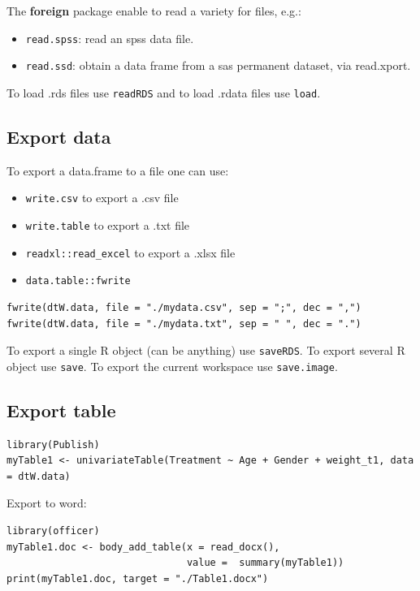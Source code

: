 \documentclass{article}
\begin{document}
\bigskip

The \textbf{foreign} package enable to read a variety for files, e.g.:
\begin{itemize}
\item \texttt{read.spss}: read an spss data file.
\item \texttt{read.ssd}: obtain a data frame from a sas permanent dataset, via read.xport.
\end{itemize}

\bigskip

To load .rds files use \texttt{readRDS} and to load .rdata files use \texttt{load}.

\subsection{Export data}
\label{sec:org182862b}

To export a data.frame to a file one can use:
\begin{itemize}
\item \texttt{write.csv} to export a .csv file
\item \texttt{write.table} to export a .txt file
\item \texttt{readxl::read\_excel} to export a .xlsx file
\item \texttt{data.table::fwrite}
\end{itemize}
\lstset{language=r,label= ,caption= ,captionpos=b,numbers=none}
\begin{lstlisting}
fwrite(dtW.data, file = "./mydata.csv", sep = ";", dec = ",")
fwrite(dtW.data, file = "./mydata.txt", sep = " ", dec = ".")
\end{lstlisting}

To export a single R object (can be anything) use \texttt{saveRDS}.
To export several R object use \texttt{save}.
To export the current workspace use \texttt{save.image}.

\subsection{Export table}
\label{sec:org6d286bd}

\lstset{language=r,label= ,caption= ,captionpos=b,numbers=none}
\begin{lstlisting}
library(Publish)
myTable1 <- univariateTable(Treatment ~ Age + Gender + weight_t1, data = dtW.data)
\end{lstlisting}

Export to word:
\lstset{language=r,label= ,caption= ,captionpos=b,numbers=none}
\begin{lstlisting}
library(officer)
myTable1.doc <- body_add_table(x = read_docx(), 
							   value =  summary(myTable1)) 
print(myTable1.doc, target = "./Table1.docx")
\end{lstlisting}
\end{document}
